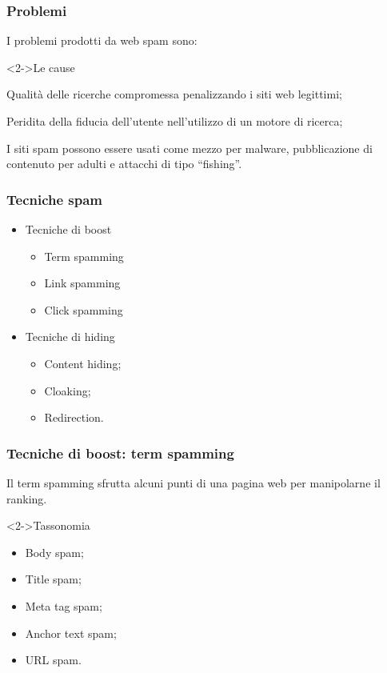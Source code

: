\documentclass{beamer}
\begin{document}
\begin{frame}
    \frametitle{Problemi}
    I problemi prodotti da web spam sono:
    \begin{block}<2->{Le cause}
    \begin{disadv}
    \item<3->Qualità delle ricerche compromessa penalizzando i siti web legittimi;
    \item<4->Peridita della fiducia dell'utente nell'utilizzo di un motore di ricerca;
    \item<5->I siti spam possono essere usati come mezzo per malware, pubblicazione di contenuto per adulti e attacchi di tipo “fishing”.
    \end{disadv}
    \end{block}
\end{frame}
\begin{frame}
    \frametitle{Tecniche spam}
    \begin{itemize}
     \item Tecniche di boost
     \begin{itemize}
      \item Term spamming
      \item Link spamming
      \item Click spamming
     \end{itemize}
     \item Tecniche di hiding
      \begin{itemize}
      \item Content hiding;
      \item Cloaking;
      \item Redirection.
     \end{itemize}
    \end{itemize}
\end{frame}
\begin{frame}
    \frametitle{Tecniche di boost: term spamming}
    Il term spamming sfrutta alcuni punti di una pagina web per manipolarne il ranking.
    \begin{block}<2->{Tassonomia}
    \begin{itemize}
    \item<2->Body spam;
    \item<2->Title spam;
    \item<2->Meta tag spam;
    \item<2->Anchor text spam;
    \item<2->URL spam.
    \end{itemize}
    \end{block}
\end{frame}
\end{document}
